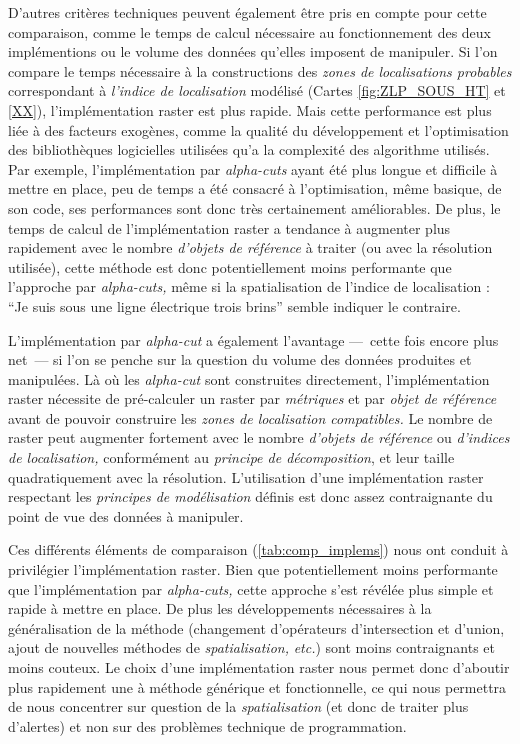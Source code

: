 D'autres critères techniques peuvent également être pris en compte
pour cette comparaison, comme le temps de calcul nécessaire au
fonctionnement des deux implémentions ou le volume des données
qu'elles imposent de manipuler. Si l'on compare le temps nécessaire à
la constructions des \emph{zones de localisations probables}
correspondant à \emph{l'indice de localisation} modélisé (Cartes
\ref{fig:ZLP_SOUS_HT} et \ref{XX}), l'implémentation raster est plus
rapide. Mais cette performance est plus liée à des facteurs exogènes,
comme la qualité du développement et l'optimisation des bibliothèques
logicielles utilisées qu'a la complexité des algorithme utilisés. Par
exemple, l'implémentation par \emph{alpha-cuts} ayant été plus longue
et difficile à mettre en place, peu de temps a été consacré à
l'optimisation, même basique, de son code, ses performances sont donc
très certainement améliorables. De plus, le temps de calcul de
l'implémentation raster a tendance à augmenter plus rapidement avec le
nombre \emph{d'objets de référence} à traiter (ou avec la résolution
utilisée), cette méthode est donc potentiellement moins performante
que l'approche par \emph{alpha-cuts,} même si la spatialisation de
l'indice de localisation : \enquote{Je suis sous une ligne électrique
  trois brins} semble indiquer le contraire.

L'implémentation par \emph{alpha-cut} a également l'avantage ---~cette
fois encore plus net~--- si l'on se penche sur la question du volume
des données produites et manipulées. Là où les \emph{alpha-cut} sont
construites directement, l'implémentation raster nécessite de
pré-calculer un raster par \emph{métriques} et par \emph{objet de
  référence} avant de pouvoir construire les \emph{zones de
  localisation compatibles.} Le nombre de raster peut augmenter
fortement avec le nombre \emph{d'objets de référence} ou
\emph{d'indices de localisation,} conformément au \emph{principe de
  décomposition}, et leur taille quadratiquement avec la
résolution. L'utilisation d'une implémentation raster respectant les
\emph{principes de modélisation} définis est donc assez contraignante
du point de vue des données à manipuler.

Ces différents éléments de comparaison (\autoref{tab:comp_implems})
nous ont conduit à privilégier l'implémentation raster. Bien que
potentiellement moins performante que l'implémentation par
\emph{alpha-cuts,} cette approche s'est révélée plus simple et rapide
à mettre en place. De plus les développements nécessaires à la
généralisation de la méthode (\eg changement d'opérateurs
d'intersection et d'union, ajout de nouvelles méthodes de
\emph{spatialisation,} \emph{etc.}) sont moins contraignants et moins
couteux. Le choix d'une implémentation raster nous permet donc
d'aboutir plus rapidement une à méthode générique et fonctionnelle, ce
qui nous permettra de nous concentrer sur question de la
\emph{spatialisation} (et donc de traiter plus d'alertes) et non sur
des problèmes technique de programmation.

